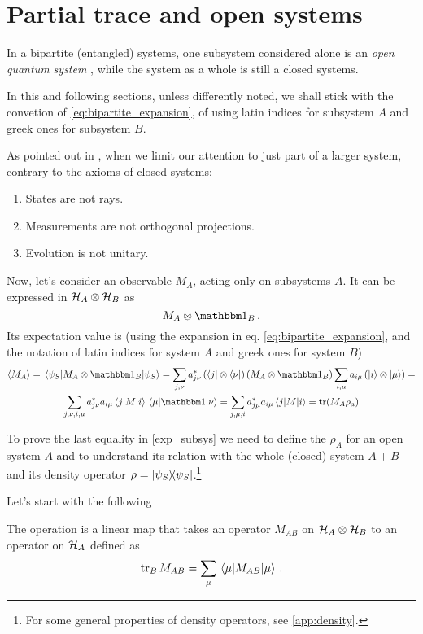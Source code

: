 \section{Partial trace and open systems}

In a bipartite (entangled) systems, one subsystem considered alone is an
\emph{open quantum system} \parencite{open_systems},
while the system as a whole is still a closed systems.

In this and following sections, unless differently noted,
we shall stick with the convetion of \eqref{eq:bipartite_expansion},
of using
latin indices for subsystem $A$ and greek ones for subsystem $B$.

As pointed out in
\cite[sec. 2.3.1]{PreskillNotes}, when we limit our attention to
just part of a larger system, contrary to the axioms of closed systems:
\begin{enumerate}
  \item States are not rays.
  \item Measurements are not orthogonal projections.
  \item Evolution is not unitary.
\end{enumerate}

Now, let's consider an observable $M_A$, acting only on subsystems $A$.
It can be expressed in $\mathcal{H}_A \otimes \mathcal{H}_B$ as
\[
  M_A \otimes \idop_B\, .
\]
Its expectation value is
(using the expansion in eq. \ref{eq:bipartite_expansion},
and the notation of latin indices for system $A$ and greek ones for system $B$)
\begin{multline}\label{exp_subsys}
  \expval{M_A} = \matrixel{\psi_S}{M_A\otimes\idop_B}{\psi_S} =
  \sum_{j,\nu}a^{*}_{j\nu}\left(\bra{j}\otimes\bra{\nu}\right)\left(M_A\otimes\idop_B\right)\sum_{i,\mu}a_{i\mu}\left(\ket{i}\otimes\ket{\mu}\right) = \\
  \sum_{j,\nu,i,\mu}a^{*}_{j\nu}a_{i\mu}\matrixel{j}{M}{i}\matrixel{\mu}{\idop}{\nu} =
  \sum_{j,\mu,i}a^{*}_{j\mu}a_{i\mu}\matrixel{j}{M}{i} =
  \tr(M_A\rho_a)
\end{multline}

To prove the last equality in \eqref{exp_subsys} we need to define the
 $\rho_A$ for an open system $A$ and to understand its
relation with the whole (closed) system $A+B$
and its density operator $\rho = \ketbra{\psi_S}{\psi_S}$.\footnote{
  For some general properties of density operators, see \ref{app:density}.
}

Let's start with the following
\begin{definition}\label{def:pTr}
  The  operation
  is a linear map
  that takes an operator
  $M_{AB}$ on $\mathcal{H}_A \otimes \mathcal{H}_B$
  to an operator on $\mathcal{H}_A$ defined as
  \[
    \tr_B M_{AB} = \sum_{\mu} \matrixel{\mu}{M_{AB}}{\mu}
    \, .
  \]
\end{definition}

